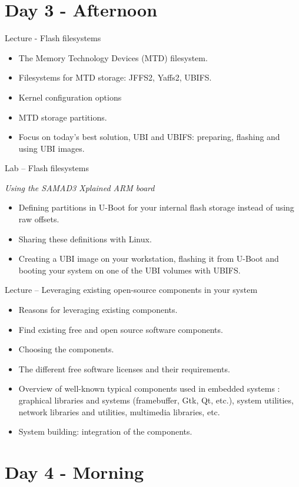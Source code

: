 \documentclass[a4paper,12pt,obeyspaces,spaces,hyphens]{article}
\begin{document}
\section{Day 3 - Afternoon}

\feagendatwocolumn
{Lecture - Flash filesystems}
{
  \begin{itemize}
  \item The Memory Technology Devices (MTD) filesystem.
  \item Filesystems for MTD storage: JFFS2, Yaffs2, UBIFS.
  \item Kernel configuration options
  \item MTD storage partitions.
  \item Focus on today's best solution, UBI and UBIFS:
	preparing, flashing and using UBI images.
  \end{itemize}
}
{Lab – Flash filesystems}
{
  {\em Using the SAMAD3 Xplained ARM board}
  \begin{itemize}
  \item Defining partitions in U-Boot for your internal
        flash storage instead of using raw offsets.
  \item Sharing these definitions with Linux.
  \item Creating a UBI image on your workstation, flashing
        it from U-Boot and booting your system on one of
        the UBI volumes with UBIFS. 
  \end{itemize}
}

\feagendaonecolumn
{Lecture – Leveraging existing open-source components in your system}
{
  \begin{itemize}
  \item Reasons for leveraging existing components.
  \item Find existing free and open source software components.
  \item Choosing the components.
  \item The different free software licenses and their requirements.
  \item Overview of well-known typical components used in
        embedded systems : graphical libraries and systems
        (framebuffer, Gtk, Qt, etc.), system utilities,
        network libraries and utilities, multimedia libraries, etc.
  \item System building: integration of the components.
  \end{itemize}
}

\section{Day 4 - Morning}
\end{document}
